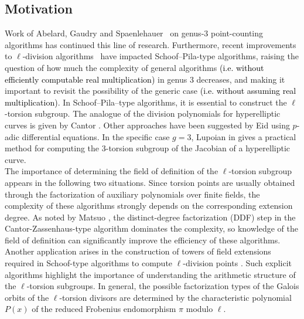 \documentclass[11pt,a4paper]{article}
\theoremstyle{plain}
\theoremstyle{definition}
\theoremstyle{remark}
\newcommand{\verde}[1]{\textcolor{black}{#1}}
\begin{document}
\subsection{Motivation}
Work of Abelard, Gaudry and Spaenlehauer~\cite{abelard2019counting}  on genus-3 point-counting algorithms has continued this line of research. Furthermore, recent improvements to $\ell$-division algorithms~\cite{Miret24} have impacted Schoof–Pila-type algorithms, raising the question of how much the complexity of general algorithms \verde{(i.e. without efficiently computable real multiplication)} in genus 3 decreases, and making it important to revisit the possibility of the generic case \verde{(i.e. without assuming real multiplication)}.
In  Schoof–Pila–type algorithms, it is essential to construct the $\ell$-torsion subgroup. The analogue of the division polynomials for hyperelliptic curves is given by Cantor \cite{Cantor1994}. Other approaches have been suggested by Eid \cite{EID202368} using $p$-adic differential equations. In the specific case $g=3$, Lupoian in \cite{LUPOIAN26} gives a practical method for computing the 3-torsion subgroup of the Jacobian of a hyperelliptic curve.\\
The importance of determining the field of definition of the \(\ell\)-torsion subgroup appears in the following two situations. Since torsion points are usually obtained through the factorization of auxiliary polynomials over finite fields, the complexity of these algorithms strongly depends on the corresponding extension degree. As noted by Matsuo \cite{IM10}, the distinct-degree factorization (DDF) step in the Cantor-Zassenhaus-type \cite{cantor1981} algorithm dominates the complexity, so knowledge of the field of definition can significantly improve the efficiency of these algorithms. Another application arises in the construction  of towers of field extensions required in Schoof-type algorithms to compute \(\ell\)-division points \cite{GS12, Miret24}.
Such explicit algorithms highlight the importance of understanding the arithmetic structure of the $\ell$-torsion subgroups. In general, the possible factorization types of the Galois orbits of the $\ell$-torsion divisors are determined by the characteristic polynomial $P(x)$ of the reduced Frobenius endomorphism $\pi$ modulo $\ell$.
\end{document}
